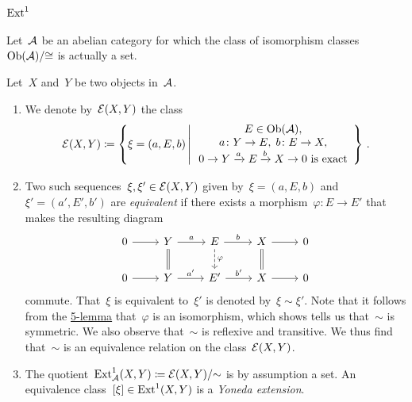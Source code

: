 \section{\texorpdfstring{$\operatorname{Ext}^1$}{Ext 1}}


\begin{conventionnonum}
  Let~$\mathcal{A}$ be an abelian category for which the class of isomorphism classes~$\operatorname{Ob}(\mathcal{A})/{\cong}$ is actually a set.
\end{conventionnonum}


\begin{remarkdefinition}
  Let~$X$ and~$Y$ be two objects in~$\mathcal{A}$.
  \begin{enumerate}
    \item
      We denote by~$\mathcal{E}(X,Y)$ the class
      \[
        \Extensions(X,Y)
        \defined
        \left\{
          \xi
          =
          (a, E, b)
        \suchthat*
          \begin{array}{c}
            E \in \Ob(\Acat),
            \\
            a \colon Y \to E, \;
            b \colon E \to X,
            \\
            \text{$0 \to Y \xto{a} E \xto{b} X \to 0$ is exact}
          \end{array}
        \right\}  \,.
      \]
    \item
      Two such sequences~$\xi, \xi' \in \mathcal{E}(X,Y)$ given by~$\xi = (a,E,b)$ and~$\xi' = (a', E', b')$  are \emph{equivalent} if there exists a morphism~$\varphi \colon E \to E'$ that makes the resulting diagram
      \[
        \begin{tikzcd}
            0
            \arrow{r}
          & Y
            \arrow{r}[above]{a}
            \arrow[equal]{d}
          & E
            \arrow{r}[above]{b}
            \arrow[dashed]{d}[right]{\varphi}
          & X
            \arrow{r}
            \arrow[equal]{d}
          & 0
          \\
            0
            \arrow{r}
          & Y
            \arrow{r}[above]{a'}
          & E'
            \arrow{r}[above]{b'}
          & X
            \arrow{r}
          & 0
        \end{tikzcd}
      \]
      commute.
      That~$\xi$ is equivalent to~$\xi'$ is denoted by~$\xi \sim \xi'$.
      Note that it follows from the \hyperref[5 lemma]{5-lemma} that~$\varphi$ is an isomorphism, which shows tells us that~$\sim$ is symmetric.
      We also observe that~$\sim$ is reflexive and transitive.
      We thus find that~$\sim$ is an equivalence relation on the class~$\mathcal{E}(X,Y)$.
    \item
      The quotient~$\operatorname{Ext}^1_{\mathcal{A}}(X,Y) \coloneqq \mathcal{E}(X,Y)/{\sim}$ is by assumption a set.
      An equivalence class~$[\xi] \in \operatorname{Ext}^1(X,Y)$ is a \emph{Yoneda extension}.
  \end{enumerate}
\end{remarkdefinition}


